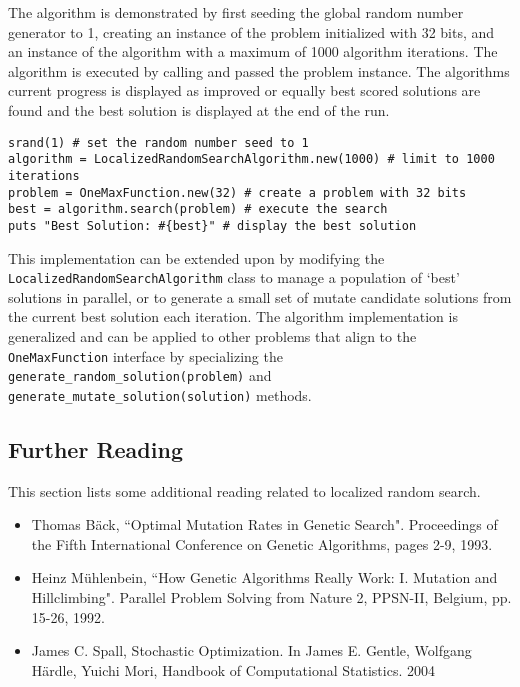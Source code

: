 The algorithm is demonstrated by first seeding the global random number generator to 1, creating an instance of the problem initialized with 32 bits, and an instance of the algorithm with a maximum of 1000 algorithm iterations. The algorithm is executed by calling and passed the problem instance. The algorithms current progress is displayed as improved or equally best scored solutions are found and the best solution is displayed at the end of the run.

\begin{lstlisting}
srand(1) # set the random number seed to 1
algorithm = LocalizedRandomSearchAlgorithm.new(1000) # limit to 1000 iterations
problem = OneMaxFunction.new(32) # create a problem with 32 bits
best = algorithm.search(problem) # execute the search
puts "Best Solution: #{best}" # display the best solution
\end{lstlisting}

This implementation can be extended upon by modifying the \texttt{LocalizedRandomSearchAlgorithm} class to manage a population of `best' solutions in parallel, or to generate a small set of mutate candidate solutions from the current best solution each iteration. The algorithm implementation is generalized and can be applied to other problems that align to the \texttt{OneMaxFunction} interface by specializing the \texttt{generate\_random\_solution(problem)} and \texttt{generate\_mutate\_solution(solution)} methods.

\subsection{Further Reading}
This section lists some additional reading related to localized random search.

\begin{itemize}
	\item Thomas Bäck, ``Optimal Mutation Rates in Genetic Search". Proceedings of the Fifth International Conference on Genetic Algorithms, pages 2-9, 1993.
    \item Heinz Mühlenbein, ``How Genetic Algorithms Really Work: I. Mutation and Hillclimbing". Parallel Problem Solving from Nature 2, PPSN-II, Belgium, pp. 15-26, 1992.
    \item James C. Spall, Stochastic Optimization. In James E. Gentle, Wolfgang Härdle, Yuichi Mori, Handbook of Computational Statistics. 2004
\end{itemize}

